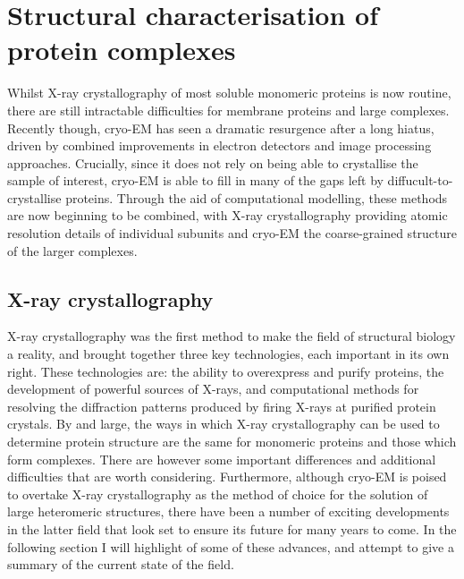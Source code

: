 \documentclass[a4paper,11pt,twoside,openright]{scrbook}
\begin{document}
\section{Structural characterisation of protein complexes}
Whilst X-ray crystallography of most soluble monomeric proteins is now routine, there are still intractable difficulties for membrane proteins and large complexes. Recently though, cryo-EM has seen a dramatic resurgence after a long hiatus, driven by combined improvements in electron detectors and image processing approaches. Crucially, since it does not rely on being able to crystallise the sample of interest, cryo-EM is able to fill in many of the gaps left by diffucult-to-crystallise proteins. Through the aid of computational modelling, these methods are now beginning to be combined, with X-ray crystallography providing atomic resolution details of individual subunits and cryo-EM the coarse-grained structure of the larger complexes.

\subsection{X-ray crystallography}
X-ray crystallography was the first method to make the field of structural biology a reality, and brought together three key technologies, each important in its own right. These technologies are: the ability to overexpress and purify proteins, the development of powerful sources of X-rays, and computational methods for resolving the diffraction patterns produced by firing X-rays at purified protein crystals. By and large, the ways in which X-ray crystallography can be used to determine protein structure are the same for monomeric proteins and those which form complexes. There are however some important differences and additional difficulties that are worth considering. Furthermore, although cryo-EM is poised to overtake X-ray crystallography as the method of choice for the solution of large heteromeric structures, there have been a number of exciting developments in the latter field that look set to ensure its future for many years to come. In the following section I will highlight of some of these advances, and attempt to give a summary of the current state of the field.

\end{document}
